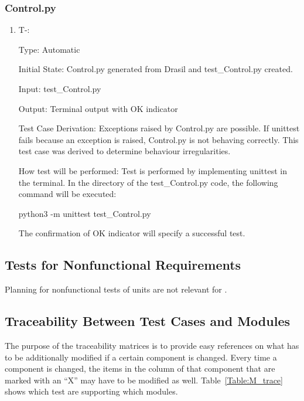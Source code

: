\documentclass[12pt, titlepage]{article}
\newcounter{tinnum} %
\begin{document}
\subsubsection{Control.py}\label{modcontrol}
\begin{enumerate}
\item{T-}\thetinnum\label{T-16}:

Type: Automatic
					
Initial State: Control.py generated from Drasil and test\_Control.py 
created.
					
Input: test\_Control.py
					
Output: Terminal output with OK indicator

Test Case Derivation: Exceptions raised by Control.py are possible. If unittest fails because an exception is raised, Control.py is not behaving correctly. This test case was derived to determine behaviour irregularities.

How test will be performed: Test is performed by implementing unittest in the 
terminal. In the directory of the test\_Control.py code, the following 
command will be executed: 
\begin{center}
python3 -m unittest test\_Control.py
\end{center}

The confirmation of OK indicator will specify a successful test.
			
					
    
\end{enumerate}


\subsection{Tests for Nonfunctional Requirements}

Planning for nonfunctional tests of units are not relevant for 
\progname{}.

\subsection{Traceability Between Test Cases and Modules}

The purpose of the traceability matrices is to provide easy references on what
has to be additionally modified if a certain component is changed.  Every time a
component is changed, the items in the column of that component that are marked
with an ``X'' may have to be modified as well.  Table~\ref{Table:M_trace} shows 
which test are supporting which modules.
\end{document}
